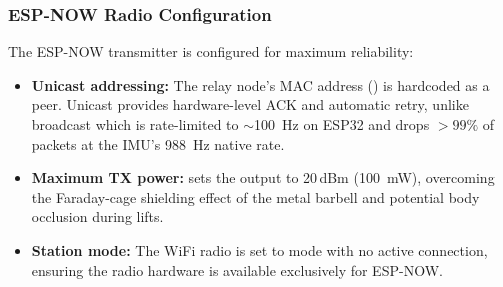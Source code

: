 \subsubsection{ESP-NOW Radio Configuration}
The ESP-NOW transmitter is configured for maximum reliability:
\begin{itemize}[nosep]
  \item \textbf{Unicast addressing:} The relay node's MAC address () is hardcoded as a peer. Unicast provides hardware-level ACK and automatic retry, unlike broadcast which is rate-limited to $\sim$\SI{100}{\hertz} on ESP32 and drops $>99\%$ of packets at the IMU's \SI{988}{\hertz} native rate.
  \item \textbf{Maximum TX power:}  sets the output to 20\,dBm (\SI{100}{\milli\watt}), overcoming the Faraday-cage shielding effect of the metal barbell and potential body occlusion during lifts.
  \item \textbf{Station mode:} The WiFi radio is set to  mode with no active connection, ensuring the radio hardware is available exclusively for ESP-NOW.
\end{itemize}
